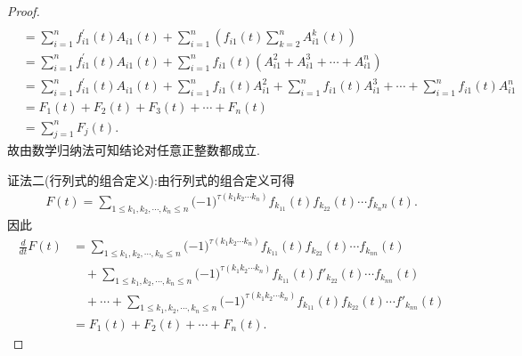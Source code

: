 \documentclass[lang=cn,newtx,10pt,scheme=chinese]{elegantbook}
\begin{document}
\begin{proof}
\begin{align*}
\\
&=\sum_{i=1}^n{f_{i1}^{\prime}\left( t \right) A_{i1}\left( t \right)}+\sum_{i=1}^n{\left( f_{i1}\left( t \right) \sum_{k=2}^n{A_{i1}^{k}\left( t \right)} \right)}
\\
&=\sum_{i=1}^n{f_{i1}^{\prime}\left( t \right) A_{i1}\left( t \right)}+\sum_{i=1}^n{f_{i1}\left( t \right) \left( A_{i1}^{2}+A_{i1}^{3}+\cdots +A_{i1}^{n} \right)}
\\
&=\sum_{i=1}^n{f_{i1}^{\prime}\left( t \right) A_{i1}\left( t \right)}+\sum_{i=1}^n{f_{i1}\left( t \right) A_{i1}^{2}}+\sum_{i=1}^n{f_{i1}\left( t \right) A_{i1}^{3}}+\cdots +\sum_{i=1}^n{f_{i1}\left( t \right) A_{i1}^{n}}
\\
&=F_1\left( t \right) +F_2\left( t \right) +F_3\left( t \right) +\cdots +F_n\left( t \right) 
\\
&=\sum_{j=1}^n{F_j\left( t \right)}.
\end{align*}
故由数学归纳法可知结论对任意正整数都成立.

{\color{blue}证法二(行列式的组合定义):}由行列式的组合定义可得
\begin{align*}
F(t)=\sum_{1\le k_1,k_2,\cdots ,k_n\le n}{(}-1)^{\tau (k_1k_2\cdots k_n)}f_{k_11}(t)f_{k_22}(t)\cdots f_{k_nn}(t).
\end{align*}
因此
\begin{align*}
\frac{d}{dt}F(t)&=\sum_{1\le k_1,k_2,\cdots ,k_n\le n}{(}-1)^{\tau (k_1k_2\cdots k_n)}f_{k_{11}}(t)f_{k_{22}}(t)\cdots f_{k_{nn}}(t)
\\
&\quad+\sum_{1\le k_1,k_2,\cdots ,k_n\le n}{(}-1)^{\tau (k_1k_2\cdots k_n)}f_{k_{11}}(t)f\prime_{k_{22}}(t)\cdots f_{k_{nn}}(t)
\\
&\quad+\cdots +\sum_{1\le k_1,k_2,\cdots ,k_n\le n}{(}-1)^{\tau (k_1k_2\cdots k_n)}f_{k_{11}}(t)f_{k_{22}}(t)\cdots f\prime_{k_{nn}}(t)
\\
&=F_1(t)+F_2(t)+\cdots +F_n(t).
\end{align*}
\end{proof}
\end{document}
